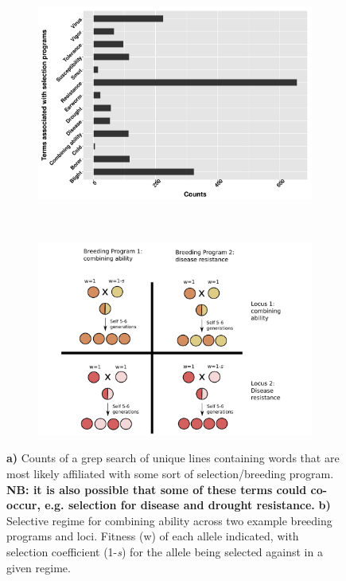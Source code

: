 \documentclass[final,12pt]{article}
\begin{document}
\begin{figure}[h]
        \centering
        \begin{subfigure}[b]{0.55\textwidth}
                \includegraphics[width=\textwidth]{disease.pdf}
                \caption{}
                \label{fig:words}
        \end{subfigure}%
        ~ %
        \begin{subfigure}[b]{0.55\textwidth}
                \includegraphics[width=\textwidth]{alleles_divergent.pdf}
                \caption{}
                \label{fig:div}
        \end{subfigure}
\caption{\textbf{a)} Counts of a grep search of unique lines containing words that are most likely affiliated with some sort of selection/breeding program. \textbf{NB: it is also possible that some of these terms could co-occur, e.g. selection for disease and drought resistance.} \textbf{b)} Selective regime for combining ability across two example breeding programs and loci. Fitness (w) of each allele indicated, with selection coefficient (1-\textit{s}) for the allele being selected against in a given regime.}
\end{figure}
\end{document}
